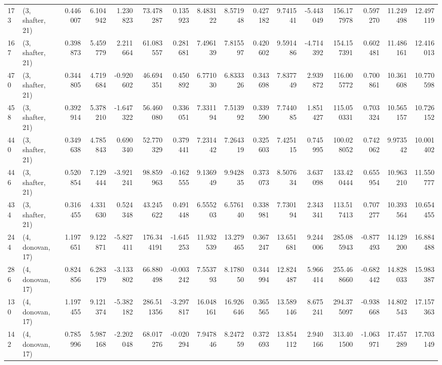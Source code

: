 \begin{tabular}{llrrrrrrrrrrrrrr}
173 &  (3, shafter, 21) &   0.446007 &   6.104942 &   1.230823 &    73.478287 &   0.135923 &   8.483122 &   8.571948 &  0.427182 &   9.741541 &  -5.443049 &   156.177978 &  0.597270 &  11.249498 &  12.497119 \\
167 &  (3, shafter, 21) &   0.398873 &   5.459779 &   2.211664 &    61.083557 &   0.281681 &   7.496139 &   7.815597 &  0.420602 &   9.591486 &  -4.714392 &   154.157391 &  0.602481 &  11.486161 &  12.416013 \\
470 &  (3, shafter, 21) &   0.344805 &   4.719684 &  -0.920602 &    46.694351 &   0.450892 &   6.771030 &   6.833326 &  0.343698 &   7.837749 &   2.939872 &   116.005772 &  0.700861 &  10.361608 &  10.770598 \\
458 &  (3, shafter, 21) &   0.392914 &   5.378210 &  -1.647322 &    56.460080 &   0.336051 &   7.331194 &   7.513992 &  0.339590 &   7.744085 &   1.851427 &   115.050331 &  0.703324 &  10.565157 &  10.726152 \\
440 &  (3, shafter, 21) &   0.349638 &   4.785843 &   0.690340 &    52.770329 &   0.379441 &   7.231442 &   7.264319 &  0.325603 &   7.425115 &   0.745995 &   100.028052 &  0.742062 &   9.973542 &  10.001402 \\
446 &  (3, shafter, 21) &   0.520854 &   7.129444 &  -3.921241 &    98.859963 &  -0.162555 &   9.136949 &   9.942835 &  0.373073 &   8.507634 &   3.637098 &   133.420444 &  0.655954 &  10.963210 &  11.550777 \\
434 &  (3, shafter, 21) &   0.316455 &   4.331630 &   0.524348 &    43.245622 &   0.491448 &   6.555203 &   6.576140 &  0.338981 &   7.730194 &   2.343341 &   113.517413 &  0.707277 &  10.393564 &  10.654455 \\
244 &  (4, donovan, 17) &   1.197651 &   9.122871 &  -5.827411 &   176.344191 &  -1.645253 &  11.932539 &  13.279465 &  0.367247 &  13.651681 &   9.244006 &   285.085943 & -0.877493 &  14.129200 &  16.884488 \\
286 &  (4, donovan, 17) &   0.824856 &   6.283179 &  -3.133802 &    66.880498 &  -0.003242 &   7.553793 &   8.178050 &  0.344994 &  12.824487 &   5.966414 &   255.468660 & -0.682442 &  14.828033 &  15.983387 \\
130 &  (4, donovan, 17) &   1.197455 &   9.121374 &  -5.382182 &   286.511356 &  -3.297817 &  16.048161 &  16.926646 &  0.365565 &  13.589146 &   8.675241 &   294.375097 & -0.938668 &  14.802543 &  17.157363 \\
142 &  (4, donovan, 17) &   0.785996 &   5.987168 &  -2.202048 &    68.017276 &  -0.020294 &   7.947846 &   8.247259 &  0.372693 &  13.854112 &   2.940166 &   313.401500 & -1.063971 &  17.457289 &  17.703149 \\

\end{tabular}
